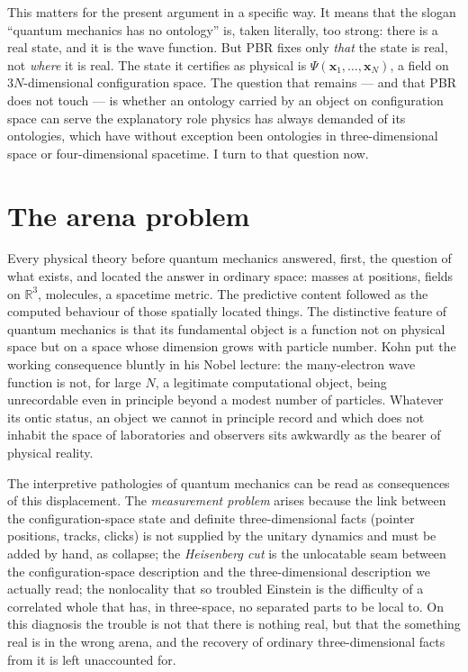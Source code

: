 \documentclass[11pt]{article}
\begin{document}
This matters for the present argument in a specific way. It means that the slogan ``quantum mechanics has no
ontology'' is, taken literally, too strong: there is a real state, and it is the wave function. But PBR fixes
only \emph{that} the state is real, not \emph{where} it is real. The state it certifies as physical is
$\Psi(\mathbf x_1,\dots,\mathbf x_N)$, a field on $3N$-dimensional configuration space. The question that remains
--- and that PBR does not touch --- is whether an ontology carried by an object on configuration space can serve
the explanatory role physics has always demanded of its ontologies, which have without exception been ontologies
in three-dimensional space or four-dimensional spacetime. I turn to that question now.

\section{The arena problem}\label{sec:arena}

Every physical theory before quantum mechanics answered, first, the question of what exists, and located the
answer in ordinary space: masses at positions, fields on $\mathbb R^3$, molecules, a spacetime metric. The
predictive content followed as the computed behaviour of those spatially located things. The distinctive feature
of quantum mechanics is that its fundamental object is a function not on physical space but on a space whose
dimension grows with particle number. Kohn \cite{Kohn} put the working consequence bluntly in his Nobel lecture:
the many-electron wave function is not, for large $N$, a legitimate computational object, being unrecordable even
in principle beyond a modest number of particles. Whatever its ontic status, an object we cannot in principle
record and which does not inhabit the space of laboratories and observers sits awkwardly as the bearer of
physical reality.

The interpretive pathologies of quantum mechanics can be read as consequences of this displacement. The
\emph{measurement problem} arises because the link between the configuration-space state and definite
three-dimensional facts (pointer positions, tracks, clicks) is not supplied by the unitary dynamics and must be
added by hand, as collapse; the \emph{Heisenberg cut} is the unlocatable seam between the configuration-space
description and the three-dimensional description we actually read; the nonlocality that so troubled Einstein
\cite{EPR} is the difficulty of a correlated whole that has, in three-space, no separated parts to be local to.
On this diagnosis the trouble is not that there is nothing real, but that the something real is in the wrong
arena, and the recovery of ordinary three-dimensional facts from it is left unaccounted for.
\end{document}
